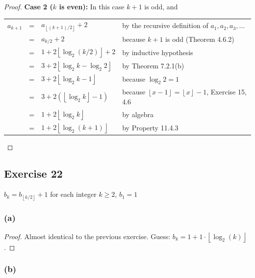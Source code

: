 \documentclass[14pt]{extarticle}
\newcommand{\cy}{\color{cyan}}
\newcommand{\floor}[1]{{\left\lfloor#1\right\rfloor}}
\begin{document}
\begin{proof}
    {\bf Case 2 (\(k\) is even):} In this case \(k + 1\) is odd, and

    \begin{tabular}{rcll}
        \(a_{k+1}\) & = & \(a_{\floor{(k+1)/2}} + 2\)          & {\cy by the recursive definition of \(a_1, a_2, a_3, \ldots\)} \\
                    & = & \(a_{k/2} + 2\)                      & {\cy because \(k + 1\) is odd (Theorem 4.6.2)}                 \\
                    & = & \(1 + 2\floor{\log_2(k/2)} + 2\)     & {\cy by inductive hypothesis}                                  \\
                    & = & \(3 + 2\floor{\log_2 k - \log_2 2}\) & {\cy by Theorem 7.2.1(b)}                                      \\
                    & = & \(3 + 2\floor{\log_2 k - 1}\)        & {\cy because \(\log_2 2 = 1\)}                                 \\
                    & = & \(3 + 2(\floor{\log_2 k} - 1)\)      & {\cy because \(\floor{x-1} = \floor{x}-1\), Exercise 15, 4.6}  \\
                    & = & \(1 + 2\floor{\log_2 k}\)            & {\cy by algebra}                                               \\
                    & = & \(1 + 2\floor{\log_2 (k+1)}\)        & {\cy by Property 11.4.3}                                       \\
    \end{tabular}
\end{proof}

\subsection{Exercise 22}
\(b_k = b_{\floor{k/2}} + 1\) for each integer \(k \geq 2\), \(b_1 = 1\)

\subsubsection{(a)}
\begin{proof}
    Almost identical to the previous exercise. Guess: \(b_k = 1 + 1 \cdot \floor{\log_2(k)}\).
\end{proof}

\subsubsection{(b)}
\end{document}

